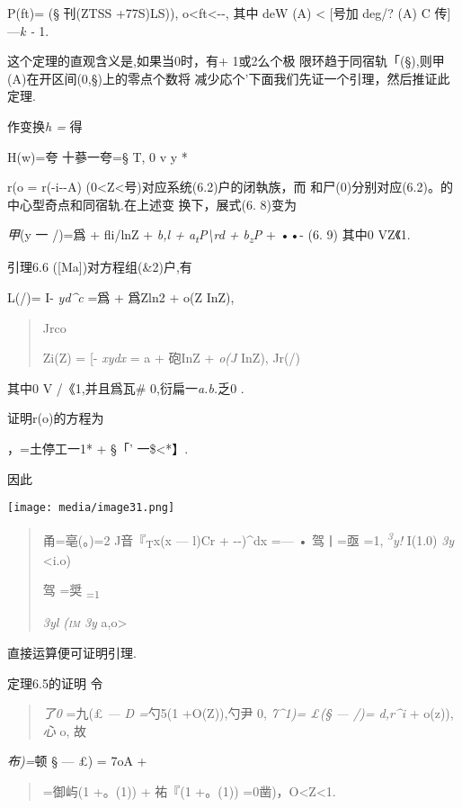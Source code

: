 \documentclass{article}
\begin{document}
P(ft)= (§ 刊(ZTSS +77S)LS)), o\textless{}ft\textless{}-\textbar{}-, 其中
deW (A) \textless{} {[}号加 deg/? (A) C 传{]}---\emph{k -} 1.

这个定理的直观含义是,如果当0时，有+ 1或2么个极
限环趋于同宿轨「(§),则甲(A)在开区间(0,§)上的零点个数将
减少応个'下面我们先证一个引理，然后推证此定理.

作变换\emph{h =} 得

H(w)=夸 十蔘一夸=§ T, 0 v y *

r(o = r(-i-\/-A) (0\textless{}Z\textless{}号)对应系统(6.2)户的闭執族，而
和尸(0)分别对应(6.2)。的中心型奇点和同宿轨.在上述变 换下，展式(6. 8)变为

\emph{甲}(y 一 /)=爲 + fli/lnZ + \emph{b,l +
a\textsubscript{t}P\textbackslash{}rd + b\textsubscript{z}P} + ••- (6.
9) 其中0 VZ《1.

引理6.6 ({[}Ma{]})对方程组(\&2)户,有

L(/)= I- \emph{yd\^{}c} =爲 + 爲Zln2 + o(Z InZ),

\begin{quote}
Jrco

Zi(Z) = {[}- \emph{xydx} = a + 砲InZ + \emph{o(J} InZ), Jr(/)
\end{quote}

其中0 V /《1,并且爲瓦\# 0,衍扁一\emph{a.b.}乏0 .

证明r(o)的方程为

，=土停工一1* + §「' 一\$\textless{}*】.

因此

\texttt{[image: media/image31.png]}

\begin{quote}
甬=亳(。)=2 J音『\textsubscript{T}x(x --- l)Cr + -\textbar{}-)\^{}dx
=--- • 驾丨=亟 =1, \emph{\textsuperscript{3}y!} I(1.0) \emph{3y}
\textless{}i.o)

驾 =奨\textbar{} \textsubscript{=1}

\emph{3yl \textsc{(im} 3y} \textbar{}a,o\textgreater{}
\end{quote}

直接运算便可证明引理.

定理6.5的证明 令

\begin{quote}
\emph{了0} =九(£ \emph{--- D =}勺5(1 +O(Z)),勺尹 0, \emph{7\^{}1)= £(§
--- /)= d,r\^{}i} + o(z)),\emph{心} o, 故
\end{quote}

\emph{布)=}顿 § --- £) = 7oA +

\begin{quote}
=御屿(1 +。(1)) + 祐『(1 +。(1)) =0凿)，O\textless{}Z\textless{}1.
\end{quote}
\end{document}
